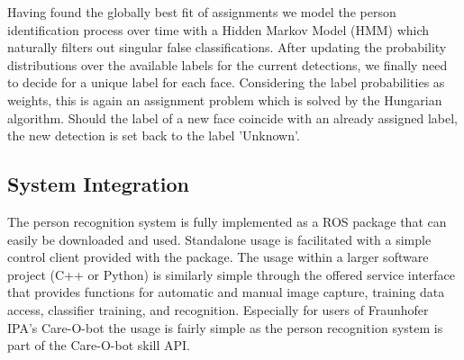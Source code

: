 Having found the globally best fit of assignments we model the person identification process over time with a Hidden Markov Model (HMM) which naturally filters out singular false classifications. %
After updating the probability distributions over the available labels for the current detections, we finally need to decide for a unique label for each face. Considering the label probabilities as weights, this is again an assignment problem which is solved by the Hungarian algorithm. Should the label of a new face coincide with an already assigned label, the new detection is set back to the label 'Unknown'.



\subsection{System Integration}
The person recognition system is fully implemented as a ROS package that can easily be downloaded and used. Standalone usage is facilitated with a simple control client provided with the package. The usage within a larger software project (C++ or Python) is similarly simple through the offered service interface that provides functions for automatic and manual image capture, training data access, classifier training, and recognition. Especially for users of Fraunhofer IPA's Care-O-bot the usage is fairly simple as the person recognition system is part of the Care-O-bot skill API.

